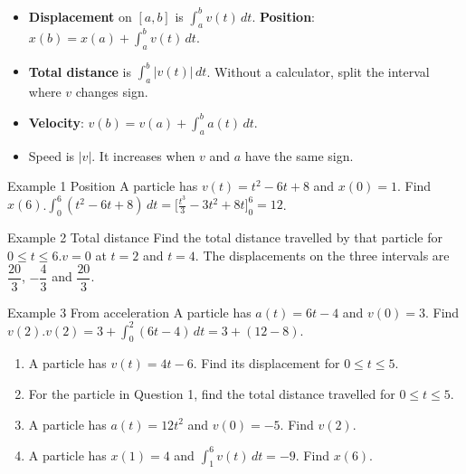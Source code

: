 \documentclass[11pt]{article}
\begin{document}

\begin{ideabox}
\begin{itemize}[leftmargin=*,itemsep=2pt,topsep=2pt]
  \item \textbf{Displacement} on $[a,b]$ is $\displaystyle\int_{a}^{b}v(t)\,dt$. \textbf{Position}: $x(b)=x(a)+\displaystyle\int_{a}^{b}v(t)\,dt$.
  \item \textbf{Total distance} is $\displaystyle\int_{a}^{b}|v(t)|\,dt$. Without a calculator, split the interval where $v$ changes sign.
  \item \textbf{Velocity}: $v(b)=v(a)+\displaystyle\int_{a}^{b}a(t)\,dt$.
  \item Speed is $|v|$. It increases when $v$ and $a$ have the same sign.
\end{itemize}
\end{ideabox}

\begin{example}{Example 1 \textperiodcentered{} Position}
A particle has $v(t)=t^2-6t+8$ and $x(0)=1$. Find $x(6)$.\soln $\displaystyle\int_{0}^{6}(t^2-6t+8)\,dt=\Big[\tfrac{t^3}{3}-3t^2+8t\Big]_0^6=12$.
\end{example}

\begin{example}{Example 2 \textperiodcentered{} Total distance}
Find the total distance travelled by that particle for $0\le t\le6$.\soln $v=0$ at $t=2$ and $t=4$. The displacements on the three intervals are $\dfrac{20}{3}$, $-\dfrac43$ and $\dfrac{20}{3}$.
\end{example}

\begin{example}{Example 3 \textperiodcentered{} From acceleration}
A particle has $a(t)=6t-4$ and $v(0)=3$. Find $v(2)$.\soln $v(2)=3+\displaystyle\int_{0}^{2}(6t-4)\,dt=3+(12-8)$.
\end{example}

\newpage
{}

\begin{enumerate}[leftmargin=*,itemsep=2pt]
  \item A particle has $v(t)=4t-6$. Find its displacement for $0\le t\le5$.\work{2.3cm}
  \item For the particle in Question 1, find the total distance travelled for $0\le t\le5$.\work{2.3cm}
  \item A particle has $a(t)=12t^2$ and $v(0)=-5$. Find $v(2)$.\work{2.3cm}
  \item A particle has $x(1)=4$ and $\displaystyle\int_{1}^{6}v(t)\,dt=-9$. Find $x(6)$.\work{2.3cm}
\end{enumerate}
\end{document}
